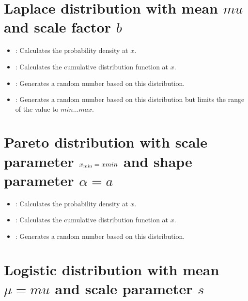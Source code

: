 \section{Laplace distribution with mean \texorpdfstring{$mu$}{mu} and scale factor \texorpdfstring{$b$}{b}}

\begin{itemize}

\item
{}:
Calculates the probability density at $x$.

\item
{}:
Calculates the cumulative distribution function at $x$.

\item
{}:
Generates a random number based on this distribution.

\item
{}:
Generates a random number based on this distribution but limits the range of the value to $min\ldots max$.

\end{itemize}



\section{Pareto distribution with scale parameter \texorpdfstring{$x_{\rm min}=xmin$}{xmin} and shape parameter \texorpdfstring{$\alpha=a$}{a}}

\begin{itemize}

\item
{}:
Calculates the probability density at $x$.

\item
{}:
Calculates the cumulative distribution function at $x$.

\item
{}:
Generates a random number based on this distribution.

\end{itemize}



\section{Logistic distribution with mean \texorpdfstring{$\mu=mu$}{mu} and scale parameter \texorpdfstring{$s$}{s}}

